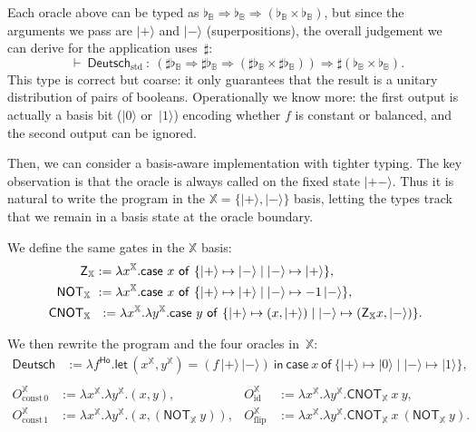 \documentclass[runningheads,orivec,envcountsame,envcountsect]{llncs}
\newcommand\ket[1]{\ensuremath{|#1\rangle}}
\newcommand\AbsBasis{\ensuremath{\mathsf{Ho}}}
\def\Pair#1#2{(#1,#2)} %
\def\Lam#1#2#3{\lambda#1^{#2}{.}#3} %
\def\letkeyword{\mathsf{let}}
\def\inkeyword{\mathsf{in}}
\def\LetP#1#2#3#4#5#6{\letkeyword\,\Pair{#1^{#2}}{#3^{#4}}=#5~\inkeyword~#6}
\def\case#1#2#3#4#5{\ensuremath{\mathsf{case}~#1~\mathsf{of}~\{#2\mapsto #4 \mid #3\mapsto #5\}}}
\def\Arr{\Rightarrow}
\def\TYP#1#2#3{#1~{\vdash}~#2~{:}~#3}
\newcommand\B{\mathbb B}
\newcommand\XB{\mathbb X}
\newcommand{\pauliZXB}{\mathsf{Z}_{\XB}}
\newcommand{\cnotXB}[2]{\mathsf{CNOT}_{\XB}\ #1\ #2}
\newcommand{\pauliXXB}[1]{\mathsf{NOT}_{\XB}\ #1}
\newcommand\basis[1]{\ensuremath{\flat_{#1}}}
\begin{document}
Each oracle above can be typed as
\(
  \basis{\B}\Arr\basis{\B}\Arr(\basis{\B}\times\basis{\B})
\),
but since the arguments we pass are $\ket{+}$ and $\ket{-}$ (superpositions),
the overall judgement we can derive for the application uses~$\sharp$:
\[
  \TYP{}{\mathsf{Deutsch}_{\mathrm{std}}}
  {(\sharp\basis{\B}\Arr\sharp\basis{\B}\Arr(\sharp\basis{\B}\times\sharp\basis{\B}))
   \Arr \sharp(\basis{\B}\times\basis{\B})}.
\]
This type is correct but coarse: it only guarantees that the result is a
unitary distribution of pairs of booleans.  Operationally we know more: the
first output is actually a basis bit ($\ket{0}$ or~$\ket{1}$) encoding whether
$f$ is constant or balanced, and the second output can be ignored.

Then, we can consider a basis-aware implementation with tighter typing.
The key observation is that the oracle is always called on the fixed state
$\ket{+-}$.  
Thus it is natural to write the program in the
$\XB=\{\ket{+},\ket{-}\}$ basis, letting the types track that we remain in a
basis state at the oracle boundary.

We define the same gates in the $\XB$ basis:
\begin{align*}
  \pauliZXB &:= \Lam{x}{\XB}{\case{x}{\ket{+}}{\ket{-}}{\ket{-}}{\ket{+}}},\\
  \pauliXXB &:= \Lam{x}{\XB}{\case{x}{\ket{+}}{\ket{-}}{\ket{+}}{-1\,\ket{-}}},\\
  \cnotXB &:= \Lam{x}{\XB}{\Lam{y}{\XB}{
    \case{y}{\ket{+}}{\ket{-}}
      {\Pair{x}{\ket{+}}}
      {\Pair{\pauliZXB{x}}{\ket{-}}}
  }}.
\end{align*}

We then rewrite the program and the four oracles in~$\XB$:
\begin{align*}
  \mathsf{Deutsch} &:= \Lam{f}{\AbsBasis}{ \LetP{x}{\XB}{y}{\XB}{(f\,\ket{+}\,\ket{-})} {\case{x}{\ket{+}}{\ket{-}}{\ket{0}}{\ket{1}}}},\\
\end{align*}
\vspace{-2\baselineskip}
\begin{align*}
  O_{\mathrm{const}\,0}^{\XB} &:= \Lam{x}{\XB}{\Lam{y}{\XB}{\Pair{x}{y}}},
  &O_{\mathrm{id}}^{\XB}\ \ &:= \Lam{x}{\XB}{\Lam{y}{\XB}{\cnotXB{x}{y}}},\\
  O_{\mathrm{const}\,1}^{\XB} &:= \Lam{x}{\XB}{\Lam{y}{\XB}{\Pair{x}{(\pauliXXB{y})}}},
  &O_{\mathrm{flip}}^{\XB} &:= \Lam{x}{\XB}{\Lam{y}{\XB}{\cnotXB{x}{(\pauliXXB{y})}}}.
\end{align*}
\end{document}
